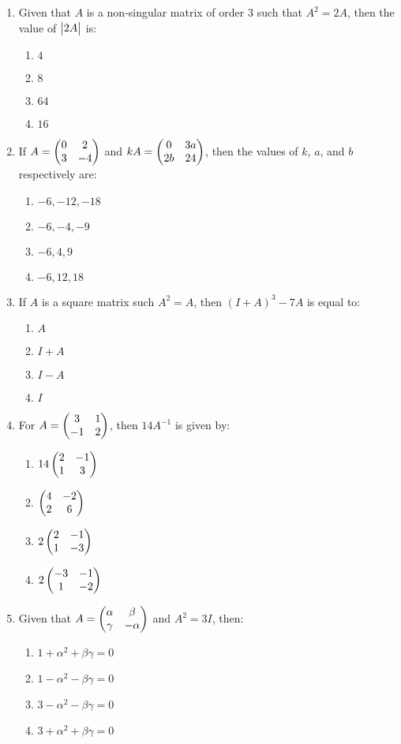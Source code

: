 \documentclass{article}
\begin{document}
\begin{enumerate}
    \item Given that $A$ is a non-singular matrix of order $3$ such that $A^2 = 2A$, then the value of $\begin{vmatrix}2A\end{vmatrix}$ is:
    \begin{enumerate}
        \item $4$
        \item $8$
        \item $64$
        \item $16$
    \end{enumerate}

    \item If $A = \begin{pmatrix}0 & 2 \\ 3 & -4\end{pmatrix}$ and $kA = \begin{pmatrix}0 & 3a \\ 2b & 24\end{pmatrix}$, then the values of $k$, $a$, and $b$ respectively are:
    \begin{enumerate}
        \item $-6, -12, -18$
        \item $-6, -4, -9$
        \item $-6, 4, 9$
        \item $-6, 12, 18$
    \end{enumerate}

    \item If $A$ is a square matrix such $A^2 = A$, then $(I + A)^3 - 7A$ is equal to:
    \begin{enumerate}
        \item $A$
        \item $I + A$
        \item $I - A$
        \item $I$ 
    \end{enumerate}

    \item For $A = \begin{pmatrix}3 & 1 \\ -1 & 2\end{pmatrix}$, then $14A^{-1}$ is given by:
    \begin{enumerate}
        \item $14 \begin{pmatrix}2 & -1 \\ 1 & 3\end{pmatrix}$
        \item $\begin{pmatrix}4 & -2 \\ 2 & 6\end{pmatrix}$
        \item $2\begin{pmatrix}2 & -1 \\ 1 & -3\end{pmatrix}$
        \item $2\begin{pmatrix}-3 & -1 \\ 1 & -2 \end{pmatrix}$
    \end{enumerate}

    \item Given that $A = \begin{pmatrix}\alpha & \beta \\ \gamma & -\alpha\end{pmatrix}$ and $A^2 = 3I$, then:
    \begin{enumerate}
        \item $1 + \alpha^2 + \beta\gamma = 0$
        \item $1 - \alpha^2 - \beta\gamma = 0$
        \item $3 - \alpha^2 - \beta\gamma = 0$
        \item $3 + \alpha^2 + \beta\gamma = 0$
    \end{enumerate}


\end{enumerate}
\end{document}
